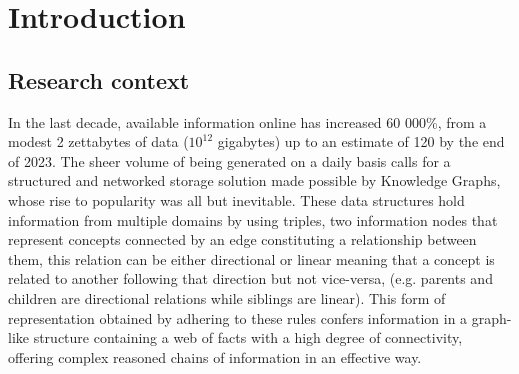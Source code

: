 \chapter{Introduction}\label{chap:introduction}



\section{Research context}\label{sec:intro-context}

In the last decade, available information online has increased 60 000\%, from a modest 2 zettabytes of data ($10^{12}$ gigabytes) up to an estimate of 120 by the end of 2023\cite{}. The sheer volume of being generated on a daily basis calls for a structured and networked storage solution made possible by Knowledge Graphs, whose rise to popularity was all but inevitable. 
These data structures hold information from multiple domains by using triples, two information nodes that represent concepts connected by an edge constituting a relationship between them, this relation can be either directional or linear meaning that a concept is related to another following that direction but not vice-versa, (e.g. parents and children are directional relations while siblings are linear).
This form of representation obtained by adhering to these rules confers information in a graph-like structure containing a web of facts with a high degree of connectivity, offering complex reasoned chains of information in an effective way.

